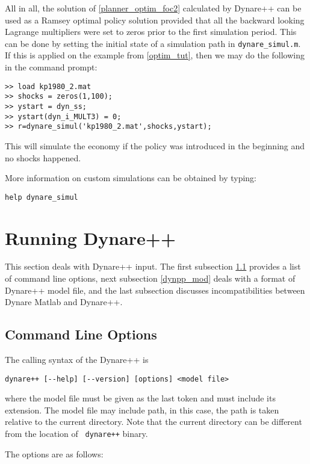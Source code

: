 \documentclass[10pt]{article}
\begin{document}
All in all, the solution of \eqref{planner_optim_foc2} calculated by
Dynare++ can be used as a Ramsey optimal policy solution provided that
all the backward looking Lagrange multipliers were set to zeros prior
to the first simulation period. This can be done by setting the
initial state of a simulation path in {\tt dynare\_simul.m}. If this
is applied on the example from \ref{optim_tut}, then we may do the
following in the command prompt:
{\small
\begin{verbatim}
>> load kp1980_2.mat
>> shocks = zeros(1,100);
>> ystart = dyn_ss;
>> ystart(dyn_i_MULT3) = 0;
>> r=dynare_simul('kp1980_2.mat',shocks,ystart);
\end{verbatim}
}
This will simulate the economy if the policy was introduced in the
beginning and no shocks happened.

More information on custom simulations can be obtained by typing:
{\small
\begin{verbatim}
help dynare_simul
\end{verbatim}
}


\section{Running Dynare++}

This section deals with Dynare++ input. The first subsection
\ref{dynpp_opts} provides a list of command line options, next
subsection \ref{dynpp_mod} deals with a format of Dynare++ model file,
and the last subsection discusses incompatibilities between Dynare
Matlab and Dynare++.

\subsection{Command Line Options}
\label{dynpp_opts}

The calling syntax of the Dynare++ is

{\small
\begin{verbatim}
dynare++ [--help] [--version] [options] <model file>
\end{verbatim}
}

\noindent where the model file must be given as the last token and
must include its extension. The model file may include path, in this
case, the path is taken relative to the current directory. Note that
the current directory can be different from the location of {\tt
dynare++} binary.

The options are as follows:

\def\desc#1{\rlap{#1}\kern4cm}
\end{document}
